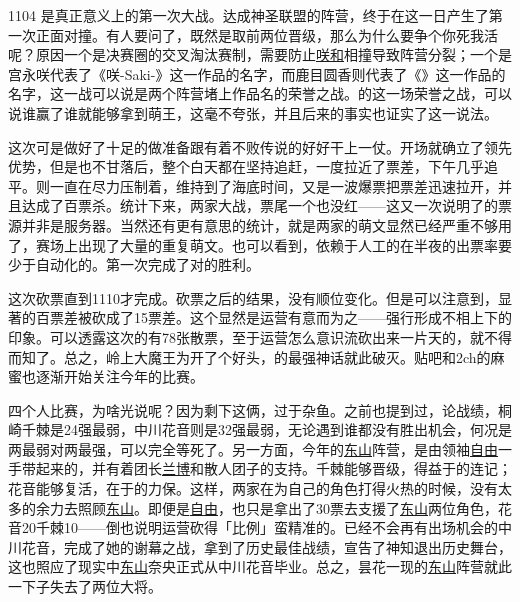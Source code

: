 1104 是真正意义上的第一次大战。达成神圣联盟的阵营，终于在这一日产生了第一次正面对撞。有人要问了，既然是取前两位晋级，那么为什么要争个你死我活呢？原因一个是决赛圈的交叉淘汰赛制，需要防止\uline{咲}\uline{和}相撞导致阵营分裂；一个是宫永咲代表了《咲-Saki-》这一作品的名字，而鹿目圆香则代表了《\Mado》这一作品的名字，这一战可以说是两个阵营堵上作品名的荣誉之战。的这一场荣誉之战，可以说谁赢了谁就能够拿到萌王，这毫不夸张，并且后来的事实也证实了这一说法。

这次可是做好了十足的做准备跟有着不败传说的好好干上一仗。开场就确立了领先优势，但是也不甘落后，整个白天都在坚持追赶，一度拉近了票差，下午几乎追平。则一直在尽力压制着，维持到了海底时间，又是一波爆票把票差迅速拉开，并且达成了百票杀。统计下来，两家大战，票尾一个也没红——这又一次说明了的票源并非是服务器。当然还有更有意思的统计，就是两家的萌文显然已经严重不够用了，赛场上出现了大量的重复萌文。也可以看到，依赖于人工的在半夜的出票率要少于自动化的。第一次完成了对的胜利。


这次砍票直到1110才完成。砍票之后的结果，没有顺位变化。但是可以注意到，显著的百票差被砍成了15票差。这个显然是运营有意而为之——强行形成不相上下的印象。可以透露这次的有78张散票，至于运营怎么意识流砍出来一片天的，就不得而知了。总之，岭上大魔王为开了个好头，的最强神话就此破灭。贴吧和2ch的麻蜜也逐渐开始关注今年的比赛。

四个人比赛，为啥光说呢？因为剩下这俩，过于杂鱼。之前也提到过，论战绩，桐崎千棘是24强最弱，中川花音则是32强最弱，无论遇到谁都没有胜出机会，何况是两最弱对两最强，可以完全等死了。另一方面，今年的\uline{东山}阵营，是由领袖\uline{自由}一手带起来的，并有着团长\uline{兰博}和散人团子的支持。千棘能够晋级，得益于的连记；花音能够复活，在于的力保。这样，两家在为自己的角色打得火热的时候，没有太多的余力去照顾\uline{东山}。即便是\uline{自由}，也只是拿出了30票去支援了\uline{东山}两位角色，花音20千棘10——倒也说明运营砍得「比例」蛮精准的。已经不会再有出场机会的中川花音，完成了她的谢幕之战，拿到了历史最佳战绩，宣告了神知退出历史舞台，这也照应了现实中\uline{东山}奈央正式从中川花音毕业。总之，昙花一现的\uline{东山}阵营就此一下子失去了两位大将。

